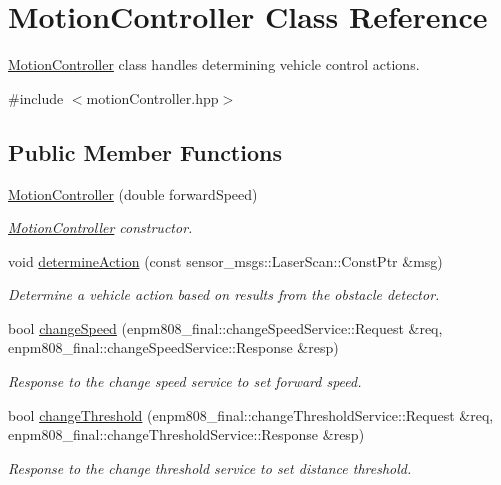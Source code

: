 \hypertarget{classMotionController}{\section{Motion\-Controller Class Reference}
\label{classMotionController}
}


\hyperlink{classMotionController}{Motion\-Controller} class handles determining vehicle control actions.  




{\ttfamily \#include $<$motion\-Controller.\-hpp$>$}

\subsection*{Public Member Functions}
\begin{DoxyCompactItemize}
\item 
\hyperlink{classMotionController_abcd258282d09d5abe23aa82bfe3a9962}{Motion\-Controller} (double forward\-Speed)
\begin{DoxyCompactList}\small\item\em \hyperlink{classMotionController}{Motion\-Controller} constructor. \end{DoxyCompactList}\item 
void \hyperlink{classMotionController_a3e0b57a37ce66bead9eee6638765638b}{determine\-Action} (const sensor\-\_\-msgs\-::\-Laser\-Scan\-::\-Const\-Ptr \&msg)
\begin{DoxyCompactList}\small\item\em Determine a vehicle action based on results from the obstacle detector. \end{DoxyCompactList}\item 
bool \hyperlink{classMotionController_a44ff223e1cf1b3f5e2d67a60e7426deb}{change\-Speed} (enpm808\-\_\-final\-::change\-Speed\-Service\-::\-Request \&req, enpm808\-\_\-final\-::change\-Speed\-Service\-::\-Response \&resp)
\begin{DoxyCompactList}\small\item\em Response to the change speed service to set forward speed. \end{DoxyCompactList}\item 
bool \hyperlink{classMotionController_a799786396899802c57501294a4daa837}{change\-Threshold} (enpm808\-\_\-final\-::change\-Threshold\-Service\-::\-Request \&req, enpm808\-\_\-final\-::change\-Threshold\-Service\-::\-Response \&resp)
\begin{DoxyCompactList}\small\item\em Response to the change threshold service to set distance threshold. \end{DoxyCompactList}\item 

\end{DoxyCompactItemize}
